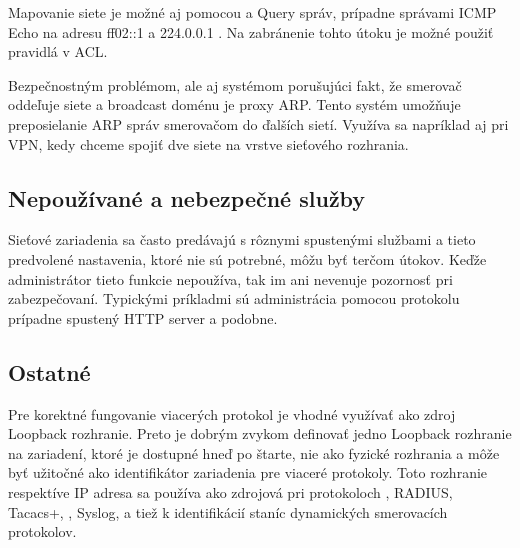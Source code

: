 Mapovanie siete je možné aj pomocou  a  Query správ, prípadne správami ICMP Echo na adresu ff02::1 a 224.0.0.1 \cite{Rey2016}\cite{Podermanski532015}. Na zabránenie tohto útoku je možné použiť pravidlá v ACL. 

Bezpečnostným problémom, ale aj systémom porušujúci fakt, že smerovač oddeľuje siete a broadcast doménu je proxy ARP. Tento systém umožňuje preposielanie ARP správ smerovačom do ďalších sietí. Využíva sa napríklad aj pri VPN, kedy chceme spojiť dve siete na vrstve sieťového rozhrania. 

\subsection*{Nepoužívané a nebezpečné služby}
Sieťové zariadenia sa často predávajú s rôznymi spustenými službami a tieto predvolené nastavenia, ktoré nie sú potrebné, môžu byť terčom útokov. Keďže administrátor tieto funkcie nepoužíva, tak im ani nevenuje pozornosť pri zabezpečovaní. Typickými príkladmi sú administrácia pomocou protokolu  prípadne spustený HTTP server a podobne. 

\subsection*{Ostatné}
Pre korektné fungovanie viacerých protokol je vhodné využívať ako zdroj Loopback rozhranie. Preto je dobrým zvykom definovať jedno Loopback rozhranie na zariadení, ktoré je dostupné hneď po štarte, nie ako fyzické rozhrania a môže byť užitočné ako identifikátor zariadenia pre viaceré protokoly. Toto rozhranie respektíve IP adresa sa používa ako zdrojová pri protokoloch , RADIUS, Tacacs+, , Syslog,  a tiež k identifikácií staníc dynamických smerovacích protokolov.
